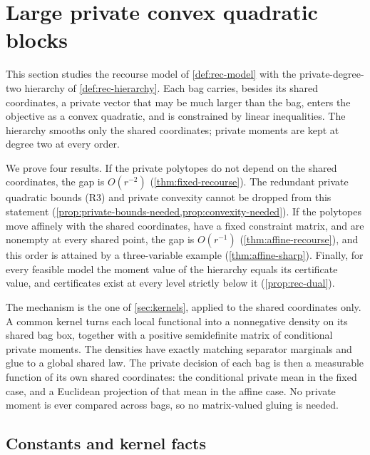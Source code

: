 \section{Large private convex quadratic blocks}\label{sec:recourse}

This section studies the recourse model of \cref{def:rec-model} with the
private-degree-two hierarchy of \cref{def:rec-hierarchy}. Each bag carries,
besides its shared coordinates, a private vector that may be much larger
than the bag, enters the objective as a convex quadratic, and is
constrained by linear inequalities. The hierarchy smooths only the shared
coordinates; private moments are kept at degree two at every order.

We prove four results. If the private polytopes do not depend on the
shared coordinates, the gap is $O(r^{-2})$ (\cref{thm:fixed-recourse}). The
redundant private quadratic bounds (R3) and private convexity cannot be
dropped from this statement (\cref{prop:private-bounds-needed,prop:convexity-needed}).
If the polytopes move affinely with the shared coordinates, have a fixed
constraint matrix, and are nonempty at every shared point, the gap is
$O(r^{-1})$ (\cref{thm:affine-recourse}), and this order is attained by a
three-variable example (\cref{thm:affine-sharp}). Finally, for every
feasible model the moment value of the hierarchy equals its certificate
value, and certificates exist at every level strictly below it
(\cref{prop:rec-dual}).

The mechanism is the one of \cref{sec:kernels}, applied to the shared
coordinates only. A common kernel turns each local functional into a
nonnegative density on its shared bag box, together with a positive
semidefinite matrix of conditional private moments. The densities have
exactly matching separator marginals and glue to a global shared law. The
private decision of each bag is then a measurable function of its own
shared coordinates: the conditional private mean in the fixed case, and a
Euclidean projection of that mean in the affine case. No private moment is
ever compared across bags, so no matrix-valued gluing is needed.

\subsection{Constants and kernel facts}\label{sec:rec-constants}

